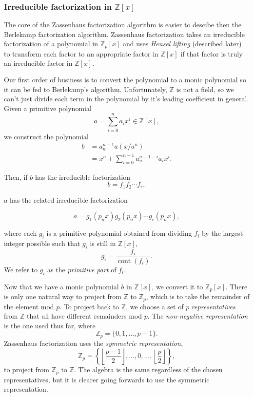 \documentclass{article}
\theoremstyle{definition}
\DeclareMathOperator{\cont}{cont}
\begin{document}
    \newpage
    
    \subsubsection{Irreducible factorization in $\mathbb{Z}[x]$}
    
    The core of the Zassenhaus factorization algorithm is easier to descibe then the Berlekamp factorization algorithm. Zassenhaus factorization takes an irreducible factorization of a polynomial in $\mathbb{Z}_p[x]$ and uses \emph{Hensel lifting} (described later) to transform each factor to an appropriate factor in $\mathbb{Z}[x]$ if that factor is truly an irreducible factor in $\mathbb{Z}[x]$.

Our first order of business is to convert the polynomial to a monic polynomial so it can be fed to Berlekamp's algorithm. Unfortunately, $\mathbb{Z}$ is not a field, so we can't just divide each term in the polynomial by it's leading coefficient in general. Given a primitive polynomial \[a = \sum_{i=0}^{n}a_ix^i \in \mathbb{Z}[x],\] we construct the polynomial
\begin{align*}
     b &= a_n^{n-1}a(x/a^n) \\
       &= x^n + \sum_{i=0}^{n-1}a_n^{n-1-i}a_ix^i.
\end{align*}

Then, if $b$ has the irreducible factorization \[ b = f_1f_2\cdots f_r,\]

$a$ has the related irreducible factorization

\[ a = g_1(p_nx)g_2(p_nx)\cdots g_r(p_nx),\]

where each $g_i$ is a primitive polynomial obtained from dividing $f_i$ by the largest integer possible such that $g_i$ is still in $\mathbb{Z}[x]$, \[ g_i = \frac{f_i}{\cont(f_i)}.\] We refer to $g_i$ as the \emph{primitive part} of $f_i$. 

Now that we have a monic polynomial $b$ in $\mathbb{Z}[x]$, we convert it to $\mathbb{Z}_p[x]$. There is only one natural way to project from $\mathbb{Z}$ to $\mathbb{Z}_p$, which is to take the remainder of the element mod $p$. To project back to $\mathbb{Z}$, we choose a set of $p$ \emph{representatives} from $\mathbb{Z}$ that all have different remainders mod $p$. The \emph{non-negative representation} is the one used thus far, where  \[\mathbb{Z}_p = \{0, 1, \ldots , p-1\} .\] Zassenhaus factorization uses the \emph{symmetric representation}, \[\mathbb{Z}_p = \left\{\left\lfloor \frac{p-1}{2} \right\rfloor,\ldots , 0, \ldots, \left\lfloor \frac{p}{2} \right\rfloor\right\} ,\] to project from $\mathbb{Z}_p$ to $\mathbb{Z}$. The algebra is the same regardless of the chosen representatives, but it is clearer going forwards to use the symmetric representation.
\end{document}

